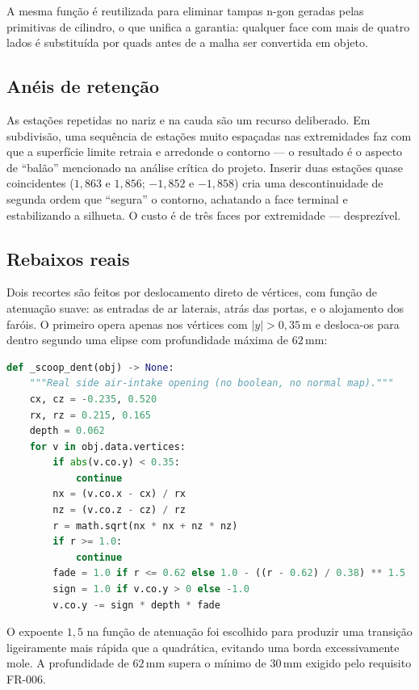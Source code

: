 A mesma fun{\c{c}}\~ao \'e reutilizada para eliminar tampas n-gon geradas pelas primitivas de
cilindro, o que unifica a garantia: qualquer face com mais de quatro lados \'e substitu\'ida por
quads antes de a malha ser convertida em objeto.

\subsection{An\'eis de reten{\c{c}}\~ao}

As esta{\c{c}}\~oes repetidas no nariz e na cauda s\~ao um recurso deliberado. Em subdivis\~ao,
uma sequ\^encia de esta{\c{c}}\~oes muito espa{\c{c}}adas nas extremidades faz com que a
superf\'icie limite retraia e arredonde o contorno --- o resultado \'e o aspecto de
``bal\~ao'' mencionado na an\'alise cr\'itica do projeto. Inserir duas esta{\c{c}}\~oes quase
coincidentes ($1{,}863$ e $1{,}856$; $-1{,}852$ e $-1{,}858$) cria uma
descontinuidade de segunda ordem que ``segura'' o contorno, achatando a face terminal e
estabilizando a silhueta. O custo \'e de tr\^es faces por extremidade --- desprez\'ivel.

\subsection{Rebaixos reais}

Dois recortes s\~ao feitos por deslocamento direto de v\'ertices, com fun{\c{c}}\~ao de
atenua{\c{c}}\~ao suave: as entradas de ar laterais, atr\'as das portas, e o alojamento dos
far\'ois. O primeiro opera apenas nos v\'ertices com $|y| > 0,35$\,m e desloca-os para dentro
segundo uma elipse com profundidade m\'axima de $62$\,mm:

\begin{lstlisting}[language=Python]
def _scoop_dent(obj) -> None:
    """Real side air-intake opening (no boolean, no normal map)."""
    cx, cz = -0.235, 0.520
    rx, rz = 0.215, 0.165
    depth = 0.062
    for v in obj.data.vertices:
        if abs(v.co.y) < 0.35:
            continue
        nx = (v.co.x - cx) / rx
        nz = (v.co.z - cz) / rz
        r = math.sqrt(nx * nx + nz * nz)
        if r >= 1.0:
            continue
        fade = 1.0 if r <= 0.62 else 1.0 - ((r - 0.62) / 0.38) ** 1.5
        sign = 1.0 if v.co.y > 0 else -1.0
        v.co.y -= sign * depth * fade
\end{lstlisting}

O expoente $1,5$ na fun{\c{c}}\~ao de atenua{\c{c}}\~ao foi escolhido para produzir uma
transi{\c{c}}\~ao ligeiramente mais r\'apida que a quadr\'atica, evitando uma borda
excessivamente mole. A profundidade de $62$\,mm supera o m\'inimo de $30$\,mm exigido pelo
requisito FR-006.

